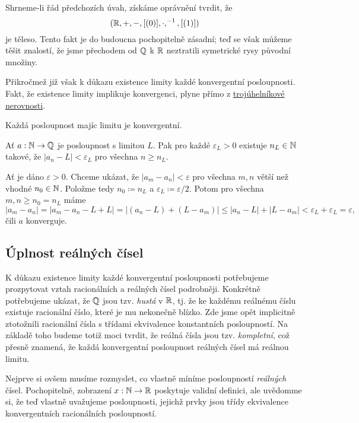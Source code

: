 Shrneme-li řád předchozích úvah, získáme oprávnění tvrdit, že
\[
 (\mathbb{R},+,-,[(0)], \cdot,^{-1},[(1)])
\]
je těleso. Tento fakt je do budoucna pochopitelně zásadní; teď se však můžeme
těšit znalostí, že jsme přechodem od $\mathbb{Q}$ k $\mathbb{R}$ neztratili symetrické rysy
původní množiny.

Přikročmež již však k důkazu existence limity každé konvergentní posloupnosti.
Fakt, že existence limity implikuje konvergenci, plyne přímo z
\hyperref[lem:trojuhelnikova-nerovnost]{trojúhelníkové nerovnosti}.

\begin{lemma}{}{}
 Každá posloupnost majíc limitu je konvergentní.
\end{lemma}
\begin{lemproof}
 Ať $a:\mathbb{N} \to \mathbb{Q}$ je posloupnost s limitou $L$. Pak pro každé $\varepsilon_L>0$
 existuje $n_L \in \mathbb{N}$ takové, že $|a_n - L| < \varepsilon_L$ pro všechna $n
 \geq n_L$.

 Ať je dáno $\varepsilon>0$. Chceme ukázat, že $|a_m - a_n| < \varepsilon$ pro
 všechna $m,n$ větší než vhodné $n_0 \in \mathbb{N}$. Položme tedy $n_0 \coloneqq n_L$ a
 $\varepsilon_L \coloneqq \varepsilon / 2$. Potom pro všechna $m,n \geq n_0 =
 n_L$ máme
 \[
  |a_m - a_n| = |a_m - a_n - L + L| = |(a_n - L) + (L - a_m)| \leq |a_n - L| +
  |L - a_m| < \varepsilon_L + \varepsilon_L = \varepsilon,
 \]
 čili $a$ konverguje.
\end{lemproof}

\subsection{Úplnost reálných čísel}
\label{ssec:uplnost-realnych-cisel}

K důkazu existence limity každé konvergentní posloupnosti potřebujeme
prozpytovat vztah racionálních a reálných čísel podrobněji. Konkrétně
potřebujeme ukázat, že $\mathbb{Q}$ jsou tzv. \emph{hustá} v $\mathbb{R}$, tj. že ke každému
reálnému číslu existuje racionální číslo, které je mu nekonečně blízko. Zde jsme
opět implicitně ztotožnili racionální čísla s třídami ekvivalence konstantních
posloupností. Na základě toho budeme totiž moci tvrdit, že reálná čísla jsou
tzv. \emph{kompletní}, což přesně znamená, že každá konvergentní posloupnost
reálných čísel má reálnou limitu.

Nejprve si ovšem musíme rozmyslet, co vlastně míníme posloupností
\emph{reálných} čísel. Pochopitelně, zobrazení $x:\mathbb{N} \to \mathbb{R}$ poskytuje validní
definici, ale uvědomme si, že teď vlastně uvažujeme posloupnosti, jejichž prvky
jsou třídy ekvivalence konvergentních racionálních posloupností.

